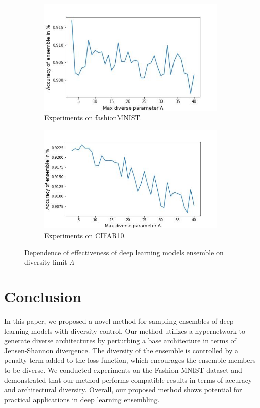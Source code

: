 \documentclass{article}
\begin{document}
\begin{figure}[h]
	\centering
	\begin{subfigure}{.46\textwidth}
        \centering
	    \includegraphics[width=1\linewidth]{fig4fashion}
	  \caption{Experiments on fashionMNIST.}
	  \label{fig:graph4fashion}
	\end{subfigure}%
    \hspace{1cm}
	\begin{subfigure}{.46\textwidth}
	  \centering
	  \includegraphics[width=1\linewidth]{fig4CIFAR}
	  \caption{Experiments on CIFAR10.}
	  \label{fig:graph4CIFAR}
	\end{subfigure}
	\caption{\label{fig:graph3} Dependence of effectiveness of deep learning models ensemble on diversity limit $\Lambda$}
	\label{fig:graph4}
\end{figure}

\section{Conclusion}

In this paper, we proposed a novel method for sampling ensembles of deep learning models with diversity control. Our method utilizes a hypernetwork to generate diverse architectures by perturbing a base architecture in terms of Jensen-Shannon divergence. The diversity of the ensemble is controlled by a penalty term added to the loss function, which encourages the ensemble members to be diverse. We conducted experiments on the Fashion-MNIST dataset and demonstrated that our method performs compatible results in terms of accuracy and architectural diversity. Overall, our proposed method shows potential for practical applications in deep learning ensembling.


\end{document}
